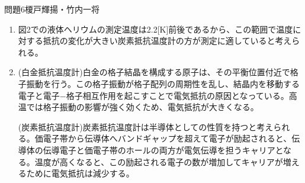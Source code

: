 \documentclass[fleqn]{jbook}
\begin{document}
\begin{answer}{問題6}{榎戸輝揚・竹内一将}
\begin{enumerate}
密度$\rho$はギブスの自由エネルギー$G$と$\rho \propto \frac{N}{V} \propto \frac{1}{\frac{\partial G}{\partial p}}$の関係にあり、
$T=T_0$に密度のカスプがあることから、ギブス自由エネルギーは1階微分にカスプがあり、$T_0$に2次相転移点を持つことが予想される。
実際、液体ヘリウム$^4\mathrm{He}$は$T_0=2.2[\mathrm{K}]$が$\lambda$点と呼ばれる2次の相転移点であることが知られており、
これを境にして高温側は$\mathrm{He}$I と呼ばれる常流動相、低温側は$\mathrm{He}$II と呼ばれる超流動相であるので、これが密度の温度依存性の由来であると考えられる。

\item
図2での液体ヘリウムの測定温度は2.2[K]前後であるから、この範囲で温度に対する抵抗の変化が大きい炭素抵抗温度計の方が測定に適していると考えられる。

\item
(白金抵抗温度計)白金の格子結晶を構成する原子は、その平衡位置付近で格子振動を行う。この格子振動が格子配列の周期性を乱し、結晶内を移動する電子と電子−格子相互作用を起こすことで電気抵抗の原因となっている。高温では格子振動の影響が強く効くため、電気抵抗が大きくなる。\par
(炭素抵抗温度計)炭素抵抗温度計は半導体としての性質を持つと考えられる。価電子帯から伝導体へバンドギャップを超えて電子が励起されると、伝導体の伝導電子と価電子帯のホールの両方が電気伝導を担うキャリアとなる。温度が高くなると、この励起される電子の数が増加してキャリアが増えるために電気抵抗は減少する。


\end{enumerate}
\end{answer}
\end{document}
